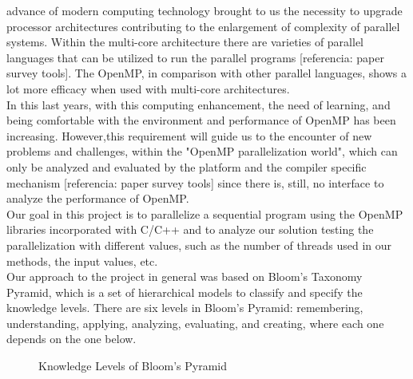 \documentclass[10pt,journal,compsoc]{IEEEtran}
\begin{document}
\maketitle

\IEEEdisplaynontitleabstractindextext

\IEEEpeerreviewmaketitle



 advance of modern computing technology brought to us the necessity to upgrade processor architectures contributing to the enlargement of complexity of parallel systems. Within the multi-core architecture there are varieties of parallel languages that can be utilized to run the parallel programs [referencia: paper survey tools]. The OpenMP, in comparison with other parallel languages, shows a lot more efficacy when used with multi-core architectures.\\
In this last years, with this computing enhancement, the need of learning, and being comfortable with the environment and performance of OpenMP has been increasing. However,this requirement will guide us to the encounter of new problems and challenges, within the "OpenMP parallelization world", which can only be analyzed and evaluated by the platform and the compiler specific mechanism [referencia: paper survey tools] since there is, still, no interface to analyze the performance of OpenMP.\\
Our goal in this project is to parallelize a sequential program using the OpenMP libraries incorporated with C/C++ and to analyze our solution testing the parallelization with different values, such as the number of threads used in our methods, the input values, etc.\\
Our approach to the project in general was based on Bloom's Taxonomy Pyramid, which is a set of hierarchical models to classify and specify the knowledge levels. There are six levels in Bloom's Pyramid: remembering, understanding, applying, analyzing, evaluating, and creating, where each one depends on the one below.\\

\begin{center}
    \begin{figure}[h!]
        \caption{Knowledge Levels of Bloom's Pyramid}
        \centering{\label{fig}}
    \end{figure}
\end{center}
\end{document}

